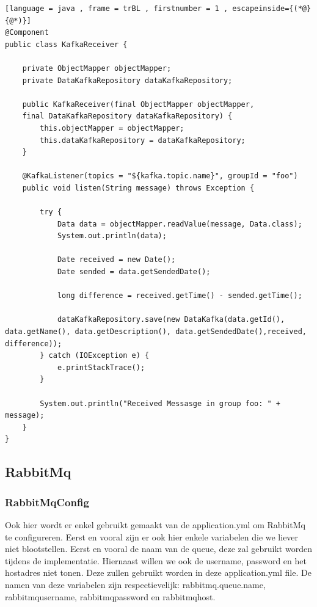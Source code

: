 \begin{lstlisting}[language = java , frame = trBL , firstnumber = 1 , escapeinside={(*@}{@*)}]
@Component
public class KafkaReceiver {
    
    private ObjectMapper objectMapper;
    private DataKafkaRepository dataKafkaRepository;
    
    public KafkaReceiver(final ObjectMapper objectMapper,
    final DataKafkaRepository dataKafkaRepository) {
        this.objectMapper = objectMapper;
        this.dataKafkaRepository = dataKafkaRepository;
    }
    
    @KafkaListener(topics = "${kafka.topic.name}", groupId = "foo")
    public void listen(String message) throws Exception {
        
        try {
            Data data = objectMapper.readValue(message, Data.class);
            System.out.println(data);
            
            Date received = new Date();
            Date sended = data.getSendedDate();
            
            long difference = received.getTime() - sended.getTime();
            
            dataKafkaRepository.save(new DataKafka(data.getId(), data.getName(), data.getDescription(), data.getSendedDate(),received, difference));
        } catch (IOException e) {
            e.printStackTrace();
        }
        
        System.out.println("Received Messasge in group foo: " + message);
    }
}
\end{lstlisting}
\subsection{RabbitMq}
\subsubsection{RabbitMqConfig}
Ook hier wordt er enkel gebruikt gemaakt van de application.yml om RabbitMq te configureren. Eerst en vooral zijn er ook hier enkele variabelen die we liever niet blootstellen. Eerst en vooral de naam van de queue, deze zal gebruikt worden tijdens de implementatie. Hiernaast willen we ook de username,  password en het hostadres niet tonen. Deze zullen gebruikt worden in deze application.yml file. De namen van deze variabelen zijn respectievelijk: rabbitmq.queue.name, rabbitmq\textunderscore username, rabbitmq\textunderscore password en rabbitmq\textunderscore host. 

